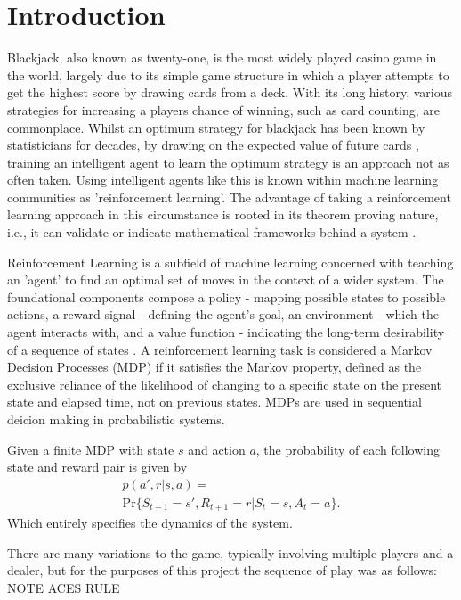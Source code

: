 \section{Introduction}

Blackjack, also known as twenty-one, is the most widely played casino game in the world, largely due to its simple game structure in which a player attempts to get the highest score by drawing cards from a deck. With its long history, various strategies for increasing a players chance of winning, such as card counting, are commonplace. Whilst an optimum strategy for blackjack has been known by statisticians for decades, by drawing on the expected value of future cards \cite{Baldwin01091956}, training an intelligent agent to learn the optimum strategy is an approach not as often taken. Using intelligent agents like this is known within machine learning communities as 'reinforcement learning'. The advantage of taking a reinforcement learning approach in this circumstance is rooted in its theorem proving nature, i.e., it can validate or indicate mathematical frameworks behind a system \cite{bidi2023reinforcementlearningcontroltheory}.

\smallskip
Reinforcement Learning is a subfield of machine learning concerned with teaching an 'agent' to find an optimal set of moves in the context of a wider system. The foundational components compose a policy - mapping possible states to possible actions, a reward signal - defining the agent's goal, an environment - which the agent interacts with, and a value function - indicating the long-term desirability of a sequence of states . A reinforcement learning task is considered a Markov Decision Processes (MDP) if it satisfies the Markov property, defined as the exclusive reliance of the likelihood of changing to a specific state on the present state and elapsed time,  not on previous states. MDPs are used in sequential deicion making in probabilistic systems. \cite{10.5555/3312046}



Given a finite MDP with state \(s\) and action \(a\), the probability of each following state and reward pair is given by
\begin{multline}
    p(a',r|s,a)=\\\text{Pr}\{S_{t+1}=s',R_{t+1}=r|S_t=s,A_t=a\}.
\end{multline}
Which entirely specifies the dynamics of the system.

\smallskip
There are many variations to the game, typically involving multiple players and a dealer, but for the purposes of this project the sequence of play was as follows: NOTE ACES RULE

